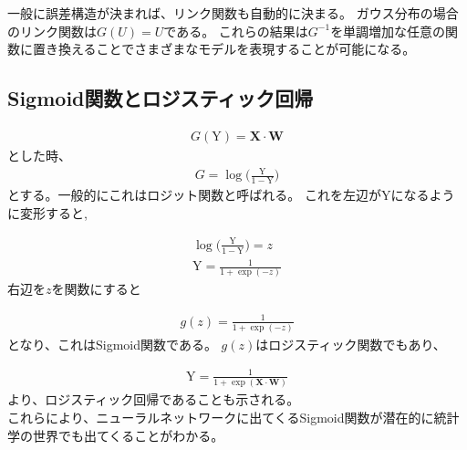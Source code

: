 一般に誤差構造が決まれば、リンク関数も自動的に決まる。
ガウス分布の場合のリンク関数は$ G(U) = U $である。
これらの結果は$ G^{-1} $を単調増加な任意の関数に置き換えることでさまざまなモデルを表現することが可能になる。


\subsection{Sigmoid関数とロジスティック回帰}
\label{history_sigmoid}
\begin{eqnarray}
G(\mathrm{Y})=\mathbf{X}\cdot  \mathbf{W}
\end{eqnarray}
とした時、
\begin{eqnarray}
G=\log \bigl(\frac{\mathrm{Y}}{1-\mathrm{Y}}\bigr)
\end{eqnarray}
とする。一般的にこれはロジット関数と呼ばれる。
これを左辺が$ \mathrm{Y} $になるように変形すると,

\begin{eqnarray}
\log \bigl(\frac{\mathrm{Y}}{1-\mathrm{Y}}\bigr) = z \\
\mathrm{Y} = \frac{1}{1 + \exp(-z)}
\end{eqnarray}
右辺を$ z $を関数にすると

\begin{eqnarray}
g(z) = \frac{1}{1 + \exp(-z)}
\end{eqnarray}
となり、これはSigmoid関数である。
$ g(z) $はロジスティック関数でもあり、


\begin{eqnarray}
\mathrm{Y} = \frac{1}{1 + \exp (\mathbf{X} \cdot  \mathbf{W})}
\end{eqnarray}
より、ロジスティック回帰であることも示される。 \\

これらにより、ニューラルネットワークに出てくるSigmoid関数が潜在的に統計学の世界でも出てくることがわかる。






